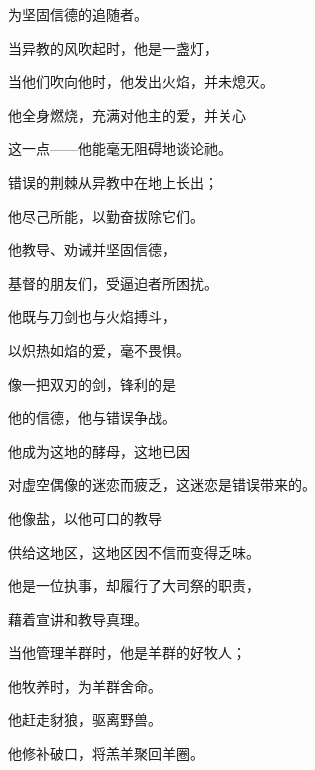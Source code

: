 为坚固信德的追随者。\par

当异教的风吹起时，他是一盏灯，\par

当他们吹向他时，他发出火焰，并未熄灭。\par

他全身燃烧，充满对他主的爱，并关心\par

这一点——他能毫无阻碍地谈论祂。\par

错误的荆棘从异教中在地上长出；\par

他尽己所能，以勤奋拔除它们。\par

他教导、劝诫并坚固信德，\par

基督的朋友们，受逼迫者所困扰。\par

他既与刀剑也与火焰搏斗，\par

以炽热如焰的爱，毫不畏惧。\par

像一把双刃的剑，锋利的是\par

他的信德，他与错误争战。\par

他成为这地的酵母，这地已因\par

对虚空偶像的迷恋而疲乏，这迷恋是错误带来的。\par

他像盐，以他可口的教导\par

供给这地区，这地区因不信而变得乏味。\par

他是一位执事，却履行了大司祭的职责，\par

藉着宣讲和教导真理。\par

当他管理羊群时，他是羊群的好牧人；\par

他牧养时，为羊群舍命。\par

他赶走豺狼，驱离野兽。\par

他修补破口，将羔羊聚回羊圈。\par


